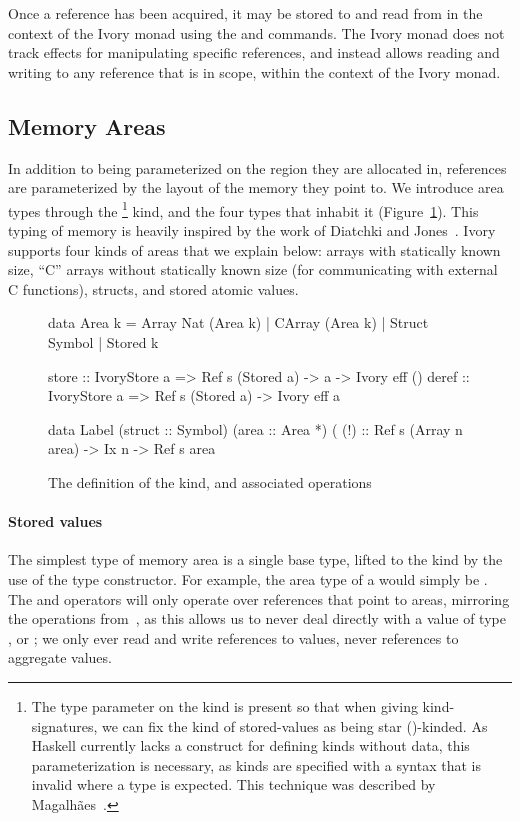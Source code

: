 Once a reference has been acquired, it may be stored to and read from in the
context of the Ivory monad using the  and  commands.  The
Ivory monad does not track effects for manipulating specific references, and
instead allows reading and writing to any reference that is in scope, within the
context of the Ivory monad.

\subsection{Memory Areas}
\label{sec:area}

In addition to being parameterized on the region they are allocated in,
references are parameterized by the layout of the memory they point to.  We
introduce area types through the  \footnote{ The type parameter on the
 kind is present so that when giving kind-signatures, we can fix the
kind of stored-values as being star (\cd{*})-kinded.  As Haskell currently lacks
a construct for defining kinds without data, this parameterization is necessary,
as kinds are specified with a syntax that is invalid where a type is expected.
This technique was described by Magalh\~{a}es~\cite{jpm:trkgp:12}.} kind, and
the four types that inhabit it (Figure~\ref{fig:area-def}).  This typing of
memory is heavily inspired by the work of Diatchki and Jones~\cite{memareas}.
Ivory supports four kinds of areas that we explain below: arrays with statically
known size, ``C'' arrays without statically known size (for communicating with
external C functions), structs, and stored atomic values.


\begin{figure}[h]
\begin{code}
data Area k = Array Nat (Area k)
            | CArray (Area k)
            | Struct Symbol
            | Stored k


store :: IvoryStore a
      => Ref s (Stored a) -> a -> Ivory eff ()
deref :: IvoryStore a
      => Ref s (Stored a) -> Ivory eff a

data Label (struct :: Symbol) (area :: Area *)
(%
(!)  :: Ref s (Array n area) -> Ix n -> Ref s area
\end{code}
\caption{The definition of the  kind, and associated operations}
\label{fig:area-def}
\end{figure}

\paragraph{Stored values}
The simplest type of memory area is a single base type, lifted to the 
kind by the use of the  type constructor.  For example, the area type
of a  would simply be . The  and
 operators will only operate over references that point to  areas,
mirroring the operations from~\cite{memareas}, as this allows us to never deal
directly with a value of type , or ; we only ever read and
write references to values, never references to aggregate values.

